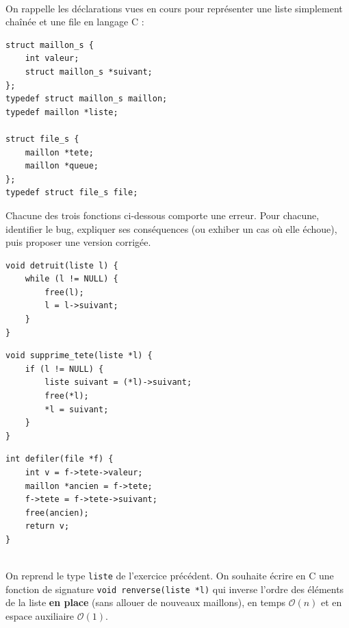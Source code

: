 \documentclass[11pt,a4paper]{article}
\begin{document}
\begin{Exercise}[title={Chasse aux bugs sur les listes chaînées et les files en C}]\\
    On rappelle les déclarations vues en cours pour représenter une liste simplement chaînée et une file en langage C :
    \begin{verbatim}
struct maillon_s {
    int valeur;
    struct maillon_s *suivant;
};
typedef struct maillon_s maillon;
typedef maillon *liste;

struct file_s {
    maillon *tete;
    maillon *queue;
};
typedef struct file_s file;
    \end{verbatim}
    Chacune des trois fonctions ci-dessous comporte une erreur. Pour chacune, identifier le bug, expliquer ses conséquences (ou exhiber un cas où elle échoue), puis proposer une version corrigée.
    \begin{verbatim}
void detruit(liste l) {
    while (l != NULL) {
        free(l);
        l = l->suivant;
    }
}
    \end{verbatim}
    \begin{verbatim}
void supprime_tete(liste *l) {
    if (l != NULL) {
        liste suivant = (*l)->suivant;
        free(*l);
        *l = suivant;
    }
}
    \end{verbatim}
    \begin{verbatim}
int defiler(file *f) {
    int v = f->tete->valeur;
    maillon *ancien = f->tete;
    f->tete = f->tete->suivant;
    free(ancien);
    return v;
}
    \end{verbatim}
\end{Exercise}

\begin{Exercise}[title={Renversement en place d'une liste chaînée}]\\
    On reprend le type {\tt liste} de l'exercice précédent. On souhaite écrire en C une fonction de signature \texttt{void renverse(liste *l)} qui inverse l'ordre des éléments de la liste \textbf{en place} (sans allouer de nouveaux maillons), en temps $\mathcal{O}(n)$ et en espace auxiliaire $\mathcal{O}(1)$.
\end{Exercise}
\end{document}

